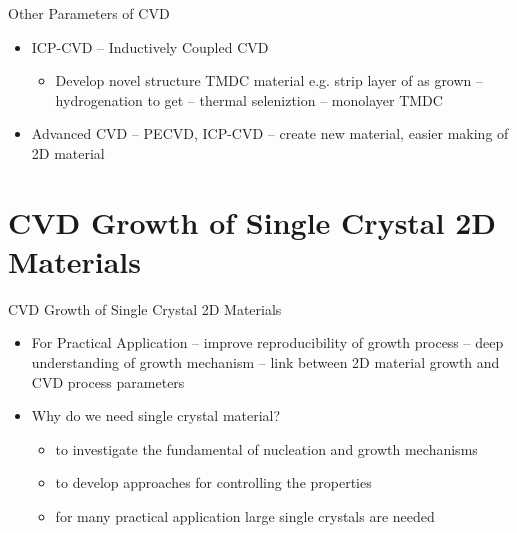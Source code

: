 \documentclass{beamer}
\begin{document}
\begin{frame}{Other Parameters of CVD}
    \begin{itemize}
        \item ICP-CVD -- Inductively Coupled CVD
        \begin{itemize}
            \item Develop novel structure TMDC material e.g. strip  layer of as grown  -- hydrogenation to get  -- thermal seleniztion --  monolayer TMDC
        \end{itemize}
        \item Advanced CVD -- PECVD, ICP-CVD -- create new material, easier making of 2D material
    \end{itemize}
\end{frame}

\section{CVD Growth of Single Crystal 2D Materials}
\begin{frame}{CVD Growth of Single Crystal 2D Materials}
    \begin{itemize}
        \item For Practical Application -- improve reproducibility of growth process -- deep understanding of growth mechanism -- link between 2D material growth and CVD process parameters
        \item Why do we need single crystal material?
        \begin{itemize}
            \item  to investigate the fundamental of nucleation and growth mechanisms
            \item to develop approaches for controlling the properties
            \item for many practical application large single crystals are needed
        \end{itemize}
    \end{itemize}
\end{frame}
\end{document}

